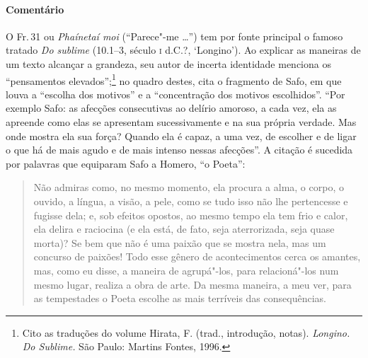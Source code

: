 {\paragraph{Comentário} O Fr.\,31 ou \textit{Phaínetaí moi} (“Parece"-me \ldots{}”) tem por fonte
principal o famoso tratado \textit{Do sublime} (10.1--3, século \textsc{i} d.C.?, `Longino'). Ao
explicar as maneiras de um texto alcançar a grandeza, seu autor de incerta identidade menciona os
“pensamentos elevados”;\footnote{ Cito as traduções do volume Hirata,
F. (trad., introdução, notas). \textit{Longino.} \textit{Do Sublime.} São
Paulo: Martins Fontes, 1996.} no quadro destes, cita o fragmento de Safo,
em que louva a “escolha dos motivos” e a “concentração dos
motivos escolhidos”. ``Por exemplo Safo: as afecções consecutivas ao delírio
amoroso, a cada vez, ela as apreende como elas se apresentam sucessivamente e
na sua própria verdade. Mas onde mostra ela sua força? Quando ela é capaz, a
uma vez, de escolher e de ligar o que há de mais agudo e de mais
intenso nessas afecções”. A citação é sucedida por palavras que equiparam Safo
a Homero, “o Poeta”: 
\pagebreak
\begin{quote}
Não admiras como, no mesmo momento, ela
procura a alma, o corpo, o ouvido, a língua, a visão, a pele, como se tudo isso
não lhe pertencesse e fugisse dela; e, sob efeitos opostos, ao mesmo tempo ela
tem frio e calor, ela delira e raciocina (e ela está, de fato, seja
aterrorizada, seja quase morta)? Se bem que não é uma paixão que se mostra
nela, mas um concurso de paixões! Todo esse gênero de acontecimentos cerca os
amantes, mas, como eu disse, a maneira de agrupá"-los, para relacioná"-los num
mesmo lugar, realiza a obra de arte. Da mesma maneira, a meu ver, para as
tempestades o Poeta escolhe as mais terríveis das consequências.
\end{quote}

}
